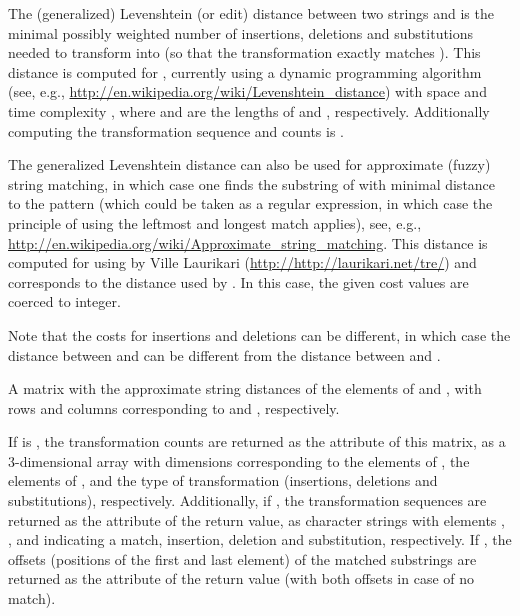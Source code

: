 \begin{Details}\relax
The (generalized) Levenshtein (or edit) distance between two strings
 and  is the minimal possibly weighted number of
insertions, deletions and substitutions needed to transform 
into  (so that the transformation exactly matches ).
This distance is computed for , currently using
a dynamic programming algorithm (see, e.g.,
\url{http://en.wikipedia.org/wiki/Levenshtein_distance}) with space
and time complexity , where  and  are the
lengths of  and , respectively.  Additionally computing
the transformation sequence and counts is .

The generalized Levenshtein distance can also be used for approximate
(fuzzy) string matching, in which case one finds the substring of
 with minimal distance to the pattern  (which could be
taken as a regular expression, in which case the principle of using
the leftmost and longest match applies), see, e.g.,
\url{http://en.wikipedia.org/wiki/Approximate_string_matching}.  This
distance is computed for  using  by
Ville Laurikari (\url{http://http://laurikari.net/tre/}) and
corresponds to the distance used by .  In this
case, the given cost values are coerced to integer.

Note that the costs for insertions and deletions can be different, in
which case the distance between  and  can be different
from the distance between  and .
\end{Details}
%
\begin{Value}
A matrix with the approximate string distances of the elements of
 and , with rows and columns corresponding to 
and , respectively.

If  is , the transformation counts are
returned as the  attribute of this matrix, as a
3-dimensional array with dimensions corresponding to the elements of
, the elements of , and the type of transformation
(insertions, deletions and substitutions), respectively.
Additionally, if , the transformation sequences
are returned as the  attribute of the return value, as
character strings with elements , ,  and
 indicating a match, insertion, deletion and substitution,
respectively.  If , the offsets (positions of
the first and last element) of the matched substrings are returned as
the  attribute of the return value (with both offsets
 in case of no match).
\end{Value}

